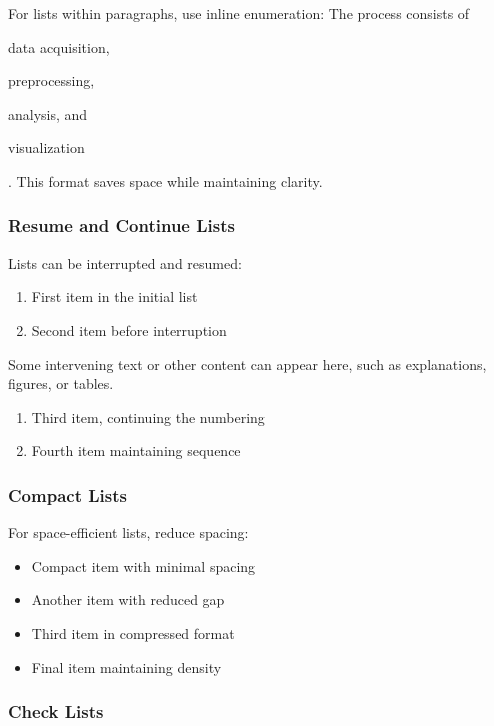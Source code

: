 For lists within paragraphs, use inline enumeration: The process consists of \begin{enumerate*}[label=(\alph*)] \item data acquisition, \item preprocessing, \item analysis, and \item visualization\end{enumerate*}. This format saves space while maintaining clarity.

\subsubsection{Resume and Continue Lists}

Lists can be interrupted and resumed:

\begin{enumerate}
    \item First item in the initial list
    \item Second item before interruption
\end{enumerate}

Some intervening text or other content can appear here, such as explanations, figures, or tables.

\begin{enumerate}[resume]
    \item Third item, continuing the numbering
    \item Fourth item maintaining sequence
\end{enumerate}

\subsubsection{Compact Lists}

For space-efficient lists, reduce spacing:

\begin{itemize}[noitemsep,topsep=0pt]
    \item Compact item with minimal spacing
    \item Another item with reduced gap
    \item Third item in compressed format
    \item Final item maintaining density
\end{itemize}

\subsubsection{Check Lists}

